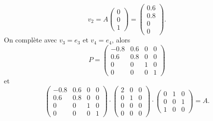 \begin{example}
\begin{displaymath}
v_2 =  A 
  \begin{pmatrix}
    0\\0\\1
  \end{pmatrix} =
  \begin{pmatrix}
    0.6 \\ 0.8 \\ 0 \\ 0
  \end{pmatrix}.
\end{displaymath}
On complète avec $v_3 = e_3$ et $v_4 = e_4$, alors 
\begin{displaymath}
P =   \begin{pmatrix}-0.8 & 0.6 & 0 & 0\\0.6 & 0.8 & 0 & 0\\0 & 0 & 1 & 0\\0 & 0 & 0 & 1\end{pmatrix}
\end{displaymath}
et 
\begin{displaymath}
  \begin{pmatrix}-0.8 & 0.6 & 0 & 0\\0.6 & 0.8 & 0 & 0\\0 & 0 & 1 & 0\\0 & 0 & 0 & 1\end{pmatrix} \cdot
  \begin{pmatrix}
    2 & 0 & 0 \\
    0 & 1 & 0 \\
    0 & 0 & 0 \\
    0 & 0 & 0
  \end{pmatrix}
\cdot
\begin{pmatrix}
  0 & 1 & 0\\0 & 0 & 1\\1 & 0 & 0 
\end{pmatrix} = A. 
\end{displaymath}

\end{example}

